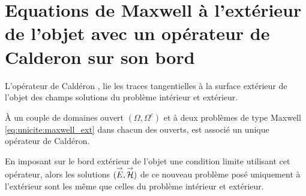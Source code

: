 \section{Equations de Maxwell à l'extérieur de l'objet avec un opérateur de Calderon sur son bord}
    L'opérateur de Caldéron \cite[Def~4, p.~108]{cessenat_mathematical_1996}, lie les traces tangentielles à la surface extérieur de l'objet des champs solutions du problème intérieur et extérieur.
    
    À un couple de domaines ouvert \((\Omega, \Omega^c)\) et à deux problèmes de type Maxwell \eqref{eq:unicite:maxwell_ext} dans chacun des ouverts, est associé un unique opérateur de Caldéron.

    En imposant sur le bord extérieur de l'objet une condition limite utilisant cet opérateur, alors les solutions \(({\overset{\rightarrow}{E}},{\overset{\rightarrow}{\mathcal{H}}})\) de ce nouveau problème posé uniquement à l'extérieur sont les même que celles du problème intérieur et extérieur.

